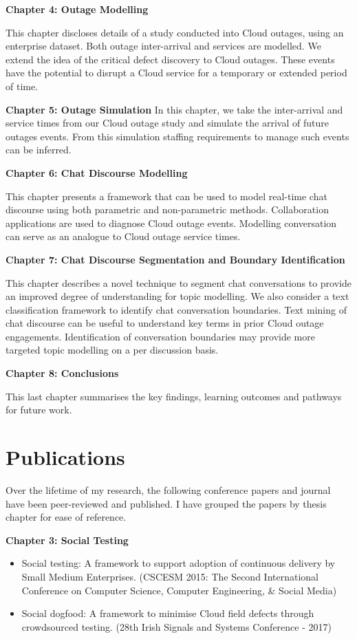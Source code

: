 \textbf{Chapter 4: Outage Modelling}

This chapter discloses details of a study conducted into Cloud outages, using an enterprise dataset. Both outage inter-arrival and services are modelled. We extend the idea of the critical defect discovery to Cloud outages. These events have the potential to disrupt a Cloud service for a temporary or extended period of time.

\textbf{Chapter 5: Outage Simulation}
In this chapter, we take the inter-arrival and service times from our Cloud outage study and simulate the arrival of future outages events. From this simulation staffing requirements to manage such events can be inferred. 

\textbf{Chapter 6: Chat Discourse Modelling}

This chapter presents a framework that can be used to model real-time chat discourse using both parametric and non-parametric methods. Collaboration applications are used to diagnose Cloud outage events. Modelling conversation can serve as an analogue to Cloud outage service times.

\textbf{Chapter 7: Chat Discourse Segmentation and Boundary Identification}

This chapter describes a novel technique to segment chat conversations to provide an improved degree of understanding for topic modelling. We also consider a text classification framework to identify chat conversation boundaries. Text mining of chat discourse can be useful to understand key terms in prior Cloud outage engagements. Identification of conversation boundaries may provide more targeted topic modelling on a per discussion basis.

\textbf{Chapter 8: Conclusions}

This last chapter summarises the key findings, learning outcomes and pathways for future work.

\section{Publications} 

Over the lifetime of my research, the following conference papers and journal have been peer-reviewed and published. I have grouped the papers by thesis chapter for ease of reference.

\textbf{Chapter 3: Social Testing}
 
\begin{itemize}
  \item Social testing: A framework to support adoption of continuous delivery by Small Medium Enterprises. (CSCESM 2015: The Second International Conference on Computer Science, Computer Engineering, \& Social Media)
  \item Social dogfood: A framework to minimise Cloud field defects through crowdsourced testing. (28th Irish Signals and Systems Conference - 2017)
\end{itemize}


